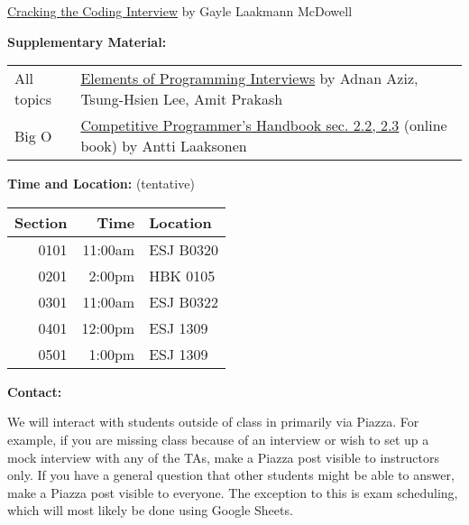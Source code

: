 \documentclass[12pt]{article}
\begin{document}
\noindent\href{https://www.amazon.com/Cracking-Coding-Interview-Programming-Questions/dp/0984782850/}{Cracking the Coding Interview}
{\small by Gayle Laakmann McDowell} \medskip

\noindent\textbf{Supplementary Material: }

\begin{table}[hbt!]
  \begin{tabular}{@{}ll}
    All topics & \href{https://www.amazon.com/Elements-Programming-Interviews-Python-Insiders/dp/1537713949}{Elements of Programming Interviews} {\small by Adnan Aziz, Tsung-Hsien Lee, Amit Prakash} \\
    Big O & \href{https://cses.fi/book/index.html}{Competitive Programmer's Handbook sec. 2.2, 2.3} {\small (online book) by Antti Laaksonen} \\ 
  \end{tabular}
\end{table}


\medskip

\noindent\textbf{Time and Location:}
(tentative)
\begin{table}[H]
  \begin{tabular}{rrl}
    Section & Time    & Location  \\
    \hline
    0101 & 11:00am & ESJ B0320 \\
    0201 & 2:00pm  & HBK 0105  \\
    0301 & 11:00am & ESJ B0322 \\
    0401 & 12:00pm & ESJ 1309  \\
    0501 & 1:00pm  & ESJ 1309
  \end{tabular}
\end{table}
\medskip
\newpage %
\noindent\textbf{Contact: }

\noindent We will interact with students outside of class in primarily via Piazza.
For example, if you are missing class because of an interview or
wish to set up a mock interview with any of the TAs, make a Piazza post
visible to instructors only.
If you have a general question that other students might be able to answer,
make a Piazza post visible to everyone.
The exception to this is exam scheduling, which will most likely be done using Google Sheets.

\end{document}
